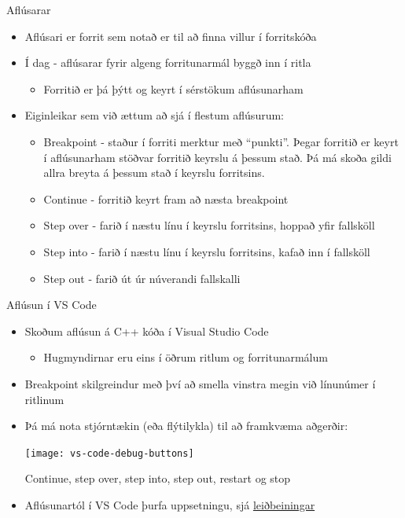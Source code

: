 \documentclass[handout]{beamer}
\begin{document}
\begin{frame}{Aflúsarar}
	\begin{itemize}
		\item Aflúsari er forrit sem notað er til að finna villur í forritskóða
		\item Í dag - aflúsarar fyrir algeng forritunarmál byggð inn í ritla
		      \begin{itemize}
			      \item Forritið er þá þýtt og keyrt í sérstökum aflúsunarham
		      \end{itemize}
		\item Eiginleikar sem við ættum að sjá í flestum aflúsurum:
		      \begin{itemize}
			      \item Breakpoint - staður í forriti merktur með ``punkti''. Þegar forritið er keyrt í aflúsunarham stöðvar forritið keyrslu á þessum stað. Þá má skoða gildi allra breyta á þessum stað í keyrslu forritsins.
			      \item Continue - forritið keyrt fram að næsta breakpoint
			      \item Step over - farið í næstu línu í keyrslu forritsins, hoppað yfir fallsköll
			      \item Step into - farið í næstu línu í keyrslu forritsins,
			            kafað inn í fallsköll
			      \item Step out - farið út úr núverandi fallskalli
		      \end{itemize}
	\end{itemize}
\end{frame}

\begin{frame}{Aflúsun í VS Code}
	\begin{itemize}
		\item Skoðum aflúsun á C++ kóða í Visual Studio Code
		      \begin{itemize}
			      \item Hugmyndirnar eru eins í öðrum ritlum og forritunarmálum
		      \end{itemize}
		\item Breakpoint skilgreindur með því að smella vinstra megin við línunúmer í ritlinum
		\item Þá má nota stjórntækin (eða flýtilykla) til að framkvæma aðgerðir:
		      \begin{center}
			      \texttt{[image: vs-code-debug-buttons]}
		      \end{center}
		      Continue, step over, step into, step out, restart og stop
		\item Aflúsunartól í VS Code þurfa uppsetningu, sjá \href{https://code.visualstudio.com/Docs/editor/debugging}{leiðbeiningar}
	\end{itemize}
\end{frame}
\end{document}
